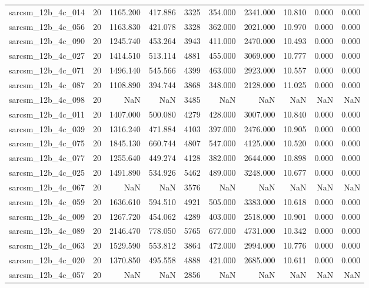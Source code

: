 \begin{tabular}{lrrrrrrrrr}
sarcsm\_12b\_4c\_014 & 20 & 1165.200 & 417.886 & 3325 & 354.000 & 2341.000 & 10.810 & 0.000 & 0.000 \\
sarcsm\_12b\_4c\_056 & 20 & 1163.830 & 421.078 & 3328 & 362.000 & 2021.000 & 10.970 & 0.000 & 0.000 \\
sarcsm\_12b\_4c\_090 & 20 & 1245.740 & 453.264 & 3943 & 411.000 & 2470.000 & 10.493 & 0.000 & 0.000 \\
sarcsm\_12b\_4c\_027 & 20 & 1414.510 & 513.114 & 4881 & 455.000 & 3069.000 & 10.777 & 0.000 & 0.000 \\
sarcsm\_12b\_4c\_071 & 20 & 1496.140 & 545.566 & 4399 & 463.000 & 2923.000 & 10.557 & 0.000 & 0.000 \\
sarcsm\_12b\_4c\_087 & 20 & 1108.890 & 394.744 & 3868 & 348.000 & 2128.000 & 11.025 & 0.000 & 0.000 \\
sarcsm\_12b\_4c\_098 & 20 & NaN & NaN & 3485 & NaN & NaN & NaN & NaN & NaN \\
sarcsm\_12b\_4c\_011 & 20 & 1407.000 & 500.080 & 4279 & 428.000 & 3007.000 & 10.840 & 0.000 & 0.000 \\
sarcsm\_12b\_4c\_039 & 20 & 1316.240 & 471.884 & 4103 & 397.000 & 2476.000 & 10.905 & 0.000 & 0.000 \\
sarcsm\_12b\_4c\_075 & 20 & 1845.130 & 660.744 & 4807 & 547.000 & 4125.000 & 10.520 & 0.000 & 0.000 \\
sarcsm\_12b\_4c\_077 & 20 & 1255.640 & 449.274 & 4128 & 382.000 & 2644.000 & 10.898 & 0.000 & 0.000 \\
sarcsm\_12b\_4c\_025 & 20 & 1491.890 & 534.926 & 5462 & 489.000 & 3248.000 & 10.677 & 0.000 & 0.000 \\
sarcsm\_12b\_4c\_067 & 20 & NaN & NaN & 3576 & NaN & NaN & NaN & NaN & NaN \\
sarcsm\_12b\_4c\_059 & 20 & 1636.610 & 594.510 & 4921 & 505.000 & 3383.000 & 10.618 & 0.000 & 0.000 \\
sarcsm\_12b\_4c\_009 & 20 & 1267.720 & 454.062 & 4289 & 403.000 & 2518.000 & 10.901 & 0.000 & 0.000 \\
sarcsm\_12b\_4c\_089 & 20 & 2146.470 & 778.050 & 5765 & 677.000 & 4731.000 & 10.342 & 0.000 & 0.000 \\
sarcsm\_12b\_4c\_063 & 20 & 1529.590 & 553.812 & 3864 & 472.000 & 2994.000 & 10.776 & 0.000 & 0.000 \\
sarcsm\_12b\_4c\_020 & 20 & 1370.850 & 495.558 & 4888 & 421.000 & 2685.000 & 10.611 & 0.000 & 0.000 \\
sarcsm\_12b\_4c\_057 & 20 & NaN & NaN & 2856 & NaN & NaN & NaN & NaN & NaN \\

\end{tabular}
